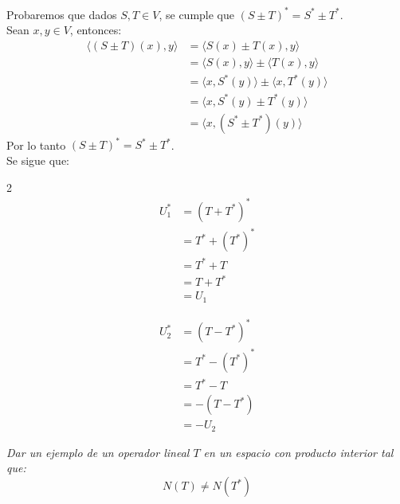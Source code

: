 \documentclass[11pt,letterpaper]{article}
\newcommand{\PrdI}[2]{\ensuremath{\langle #1, #2 \rangle}}
\begin{document}
\begin{Solucion}
Probaremos que dados $S,T \in V$, se cumple que $(S\pm T)^*=S^*\pm T^*$.\\[10pt]
    Sean $x,y\in V$, entonces:
    \begin{align*}
        \PrdI{(S\pm T)(x)}{y} &= \PrdI{S(x)\pm T(x)}{y}  \\
        &=\PrdI{S(x)}{y} \pm \PrdI{T(x)}{y} \\
        &=\PrdI{x}{S^*(y)} \pm \PrdI{x}{T^*(y)} \\
        &=\PrdI{x}{S^*(y)\pm T^*(y)} \\
        &=\PrdI{x}{(S^*\pm T^*)(y)}
    \end{align*}
    Por lo tanto $(S\pm T)^*=S^*\pm T^*$.\\[10pt]
    Se sigue que:
\begin{multicols}{2}
    \begin{align*}
        U_1^* &= (T+T^*)^* \\
        &= T^* + (T^*)^* \\
        &= T^* + T \\
        &=T+T^* \\
        &= U_1
    \end{align*}

    \begin{align*}
        U_2^* &= (T-T^*)^* \\
        &= T^* - (T^*)^* \\
        &= T^* - T \\
        &=-(T-T^*) \\
        &=-U_2
    \end{align*}
\end{multicols}

\end{Solucion}
\begin{tcolorbox}[
	title = \textcolor{black}{\textcolor{white}{Problema 3}},]
\textit{Dar un ejemplo de un operador lineal $T$ en un espacio con producto interior tal que:
\begin{equation*}
    N(T)\neq N(T^*)
\end{equation*}
}
\end{tcolorbox}
\end{document}
